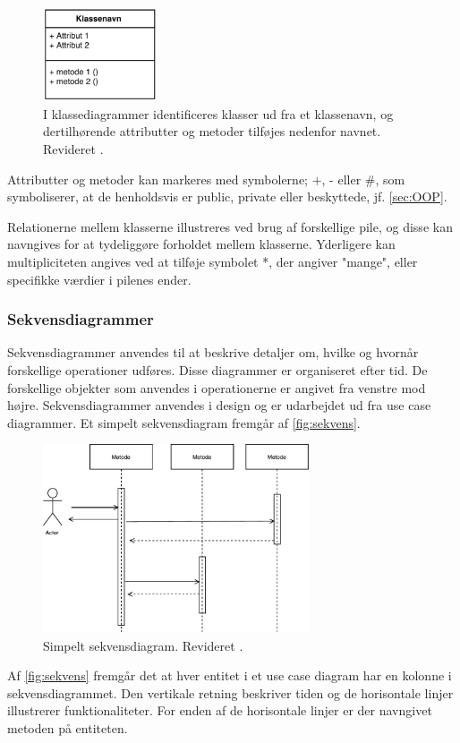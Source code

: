 \begin{figure} [H]
\centering
\includegraphics[width=0.3\textwidth]{figures/klassediag}
\caption{I klassediagrammer identificeres klasser ud fra et klassenavn, og dertilhørende attributter og metoder tilføjes nedenfor navnet. Revideret \cite{Fowler2004}.}
\label{fig:klassediagram}
\end{figure}

\noindent
Attributter og metoder kan markeres med symbolerne; +, - eller \#, som symboliserer, at de henholdsvis er public, private eller beskyttede, jf. \autoref{sec:OOP}.

Relationerne mellem klasserne illustreres ved brug af forskellige pile, og disse kan navngives for at tydeliggøre forholdet mellem  klasserne. Yderligere kan multipliciteten angives ved at tilføje symbolet *, der angiver "mange", eller specifikke værdier i pilenes ender. 


\subsubsection{Sekvensdiagrammer}
Sekvensdiagrammer anvendes til at beskrive detaljer om, hvilke og hvornår forskellige operationer udføres. Disse diagrammer er organiseret efter tid. De forskellige objekter som anvendes i operationerne er angivet fra venstre mod højre. Sekvensdiagrammer anvendes i design og er udarbejdet ud fra use case diagrammer.\cite{Brahma2015} Et simpelt sekvensdiagram fremgår af \autoref{fig:sekvens}.

\begin{figure} [H]
\centering
\includegraphics[width=0.7\textwidth]{figures/sekvens}
\caption{Simpelt sekvensdiagram. Revideret \cite{Brahma2015}.}
\label{fig:sekvens}
\end{figure}

\noindent
Af \autoref{fig:sekvens} fremgår det at hver entitet i et use case diagram har en kolonne i sekvensdiagrammet. Den vertikale retning beskriver tiden og de horisontale linjer illustrerer funktionaliteter. For enden af de horisontale linjer er der navngivet metoden på entiteten.\cite{Brahma2015}